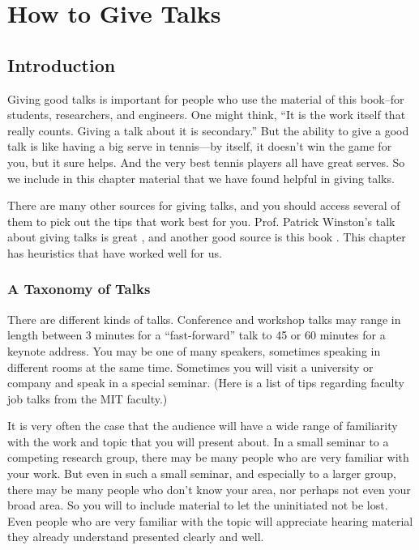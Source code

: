 \chapter{How to Give Talks}
\label{chapter:how_to_give_talks}

\section{Introduction}
Giving good talks is important for people who use the material of this book--for students, researchers, and engineers.
One  might think,  ``It is the work itself that really counts.  Giving a talk about it is secondary.''
But the ability to give a good talk is like having a big serve in tennis—by itself, it doesn’t win the game for you, but it sure helps.  And the very best tennis players all have great serves.  So we include in this chapter material that we have found helpful in giving talks.

There are many other sources for giving talks, and you should access several of them to pick out the tips that work best for you.  Prof. Patrick Winston's talk about giving talks is great \cite{WinstonSpeaks}, and another good source is this book \cite{Hoogterp}.   This chapter has heuristics that have worked well for us.

\subsection{A Taxonomy of Talks}

There are different kinds of talks.  Conference and workshop talks may range in length between 3 minutes for a ``fast-forward'' talk to 45 or 60 minutes for a keynote address.  You may be one of many speakers, sometimes speaking in different rooms at the same time.
Sometimes you will visit a university or company and speak in a special seminar. (Here \cite{MITFacultyJobTalks2022} is a list of tips regarding faculty job talks from the MIT faculty.)

It is very often the case that the audience will have a wide range of familiarity with the work and topic that you will present about.  In a small seminar to a competing research group, there may be many people who are very familiar with your work.  But even in such a small seminar, and especially to a larger group, there may be many people who don't know your area, nor perhaps not even your broad area.  So you will to include material to let the uninitiated not be lost.  Even people who are very  familiar with the topic will appreciate hearing material they already understand presented clearly and well.

